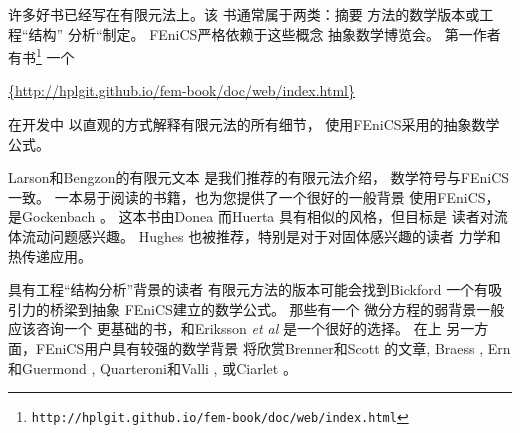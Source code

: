 许多好书已经写在有限元法上。该
书通常属于两类：摘要
方法的数学版本或工程“结构”
分析“制定。 FEniCS严格依赖于这些概念
抽象数学博览会。 第一作者有书\footnote{\texttt{http://hplgit.github.io/fem-book/doc/web/index.html}}\cite{Langtangen_Mardal_FEM_2016}
一个
\begin{center}
  \url{{http://hplgit.github.io/fem-book/doc/web/index.html}}
\end{center}
在开发中
以直观的方式解释有限元法的所有细节，
使用FEniCS采用的抽象数学公式。

Larson和Bengzon的有限元文本 \cite{Larson_2013}
是我们推荐的有限元法介绍，
数学符号与FEniCS一致。
一本易于阅读的书籍，也为您提供了一个很好的一般背景
使用FEniCS，是Gockenbach \cite{Gockenbach2006}。 这本书由Donea
而Huerta \cite{DoneaHuerta2003}具有相似的风格，但目标是
读者对流体流动问题感兴趣。 Hughes \cite{Hughes1987}
也被推荐，特别是对于对固体感兴趣的读者
力学和热传递应用。

具有工程“结构分析”背景的读者
有限元方法的版本可能会找到Bickford
\cite{Bickford1994}一个有吸引力的桥梁到抽象
FEniCS建立的数学公式。 那些有一个
微分方程的弱背景一般应该咨询一个
更基础的书，和Eriksson \emph{et al}
\cite{ErikssonEstepHansboEtAl1996}是一个很好的选择。 在上
另一方面，FEniCS用户具有较强的数学背景
将欣赏Brenner和Scott \cite{BrennerScott2008}的文章, 
Braess \cite{Braess2007}, Ern和Guermond \cite{ErnGuermond2004}, 
Quarteroni和Valli \cite{QuarteroniValli1994}, 或Ciarlet
\cite{Ciarlet2002}。
